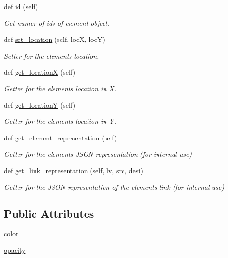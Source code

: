 \begin{DoxyCompactItemize}
def \hyperlink{classbridges_1_1element_1_1_element_aef2ce692ffbd43304790b594e6a6dc66}{id} (self)
\begin{DoxyCompactList}\small\item\em Get numer of ids of element object. \end{DoxyCompactList}\item 
def \hyperlink{classbridges_1_1element_1_1_element_aa1387621f7afa6b6f6acd052a1126320}{set\+\_\+location} (self, locX, locY)
\begin{DoxyCompactList}\small\item\em Setter for the element\textquotesingle{}s location. \end{DoxyCompactList}\item 
def \hyperlink{classbridges_1_1element_1_1_element_aa921953dab3cec5253e813bb1709895a}{get\+\_\+locationX} (self)
\begin{DoxyCompactList}\small\item\em Getter for the element\textquotesingle{}s location in X. \end{DoxyCompactList}\item 
def \hyperlink{classbridges_1_1element_1_1_element_a108f62843d084beaf5fcf5fd202853c5}{get\+\_\+locationY} (self)
\begin{DoxyCompactList}\small\item\em Getter for the element\textquotesingle{}s location in Y. \end{DoxyCompactList}\item 
def \hyperlink{classbridges_1_1element_1_1_element_a511fbc6323616d806ae0ae33010f4654}{get\+\_\+element\+\_\+representation} (self)
\begin{DoxyCompactList}\small\item\em Getter for the element\textquotesingle{}s J\+S\+ON representation (for internal use) \end{DoxyCompactList}\item 
def \hyperlink{classbridges_1_1element_1_1_element_a8f220d7b81c0e0dd84b9eff33ade76b9}{get\+\_\+link\+\_\+representation} (self, lv, src, dest)
\begin{DoxyCompactList}\small\item\em Getter for the J\+S\+ON representation of the element\textquotesingle{}s link (for internal use) \end{DoxyCompactList}\end{DoxyCompactItemize}
\subsection*{Public Attributes}
\begin{DoxyCompactItemize}
\item 
\hyperlink{classbridges_1_1element_1_1_element_a568fd16a353d7852571aa947433095ea}{color}
\item 
\hyperlink{classbridges_1_1element_1_1_element_a5af50d5fc696eb8c295245bd5d1c0c91}{opacity}
\end{DoxyCompactItemize}
